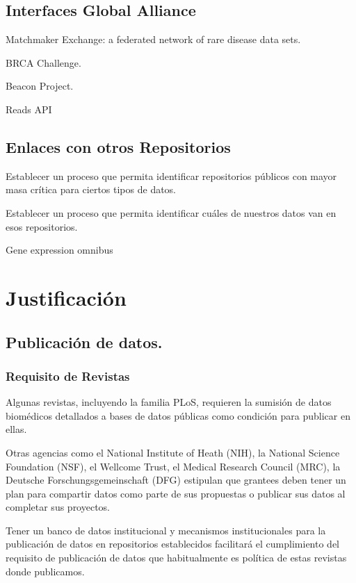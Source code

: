 \documentclass[
10pt, %
letterpaper, %
oneside, %
headinclude,footinclude, %
BCOR5mm, %
]{scrartcl}
\begin{document}
\subsection{Interfaces Global Alliance}

Matchmaker Exchange: a federated network of rare disease data sets.

BRCA Challenge.

Beacon Project.

Reads API


\subsection{Enlaces con otros Repositorios}
Establecer un proceso que permita identificar repositorios públicos
con mayor masa crítica para ciertos tipos de datos.

Establecer un proceso que permita identificar cuáles de nuestros datos
van en esos repositorios.
\cite{_genebank_????}
\cite{king_introduction_2007}

Gene expression omnibus

\section{Justificación}

\subsection{Publicación de datos.}


\subsubsection{Requisito de Revistas}

Algunas revistas, incluyendo la familia PLoS, requieren la sumisión de
datos biomédicos detallados a bases de datos públicas como condición
para publicar en ellas.\cite{piwowar_sharing_2007, hrynaszkiewicz}

Otras agencias como el National Institute of Heath (NIH), la National
Science Foundation (NSF), el Wellcome Trust, el Medical Research
Council (MRC), la Deutsche Forschungsgemeinschaft (DFG) estipulan que
grantees deben tener un plan para compartir datos como parte de sus
propuestas o publicar sus datos al completar sus
proyectos.\cite{wicherts_publish_2012}

Tener un banco de datos institucional y mecanismos institucionales
para la publicación de datos en repositorios establecidos facilitará
el cumplimiento del requisito de publicación de datos que
habitualmente es política de estas revistas donde publicamos.
\end{document}
